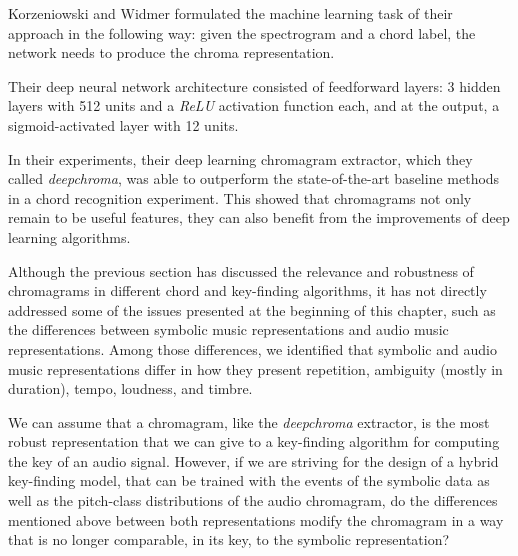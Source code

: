 Korzeniowski and Widmer formulated the machine learning task
of their approach in the following way: given the
spectrogram and a chord label, the network needs to produce
the chroma representation.

Their deep neural network architecture consisted of
feedforward layers: 3 hidden layers with 512 units and a
\emph{ReLU} activation function each, and at the output, a
sigmoid-activated layer with 12 units.

In their experiments, their deep learning chromagram
extractor, which they called \emph{deepchroma}, was able to
outperform the state-of-the-art baseline methods in a chord
recognition experiment. This showed that chromagrams not
only remain to be useful features, they can also benefit
from the improvements of deep learning algorithms.


Although the previous section has discussed the relevance
and robustness of chromagrams in different chord and
key-finding algorithms, it has not directly addressed some
of the issues presented at the beginning of this chapter,
such as the differences between symbolic music
representations and audio music representations. Among those
differences, we identified that symbolic and audio music
representations differ in how they present repetition,
ambiguity (mostly in duration), tempo, loudness, and timbre.

We can assume that a chromagram, like the \emph{deepchroma}
extractor, is the most robust representation that we can
give to a key-finding algorithm for computing the key of an
audio signal. However, if we are striving for the design of
a hybrid key-finding model, that can be trained with the
events of the symbolic data as well as the pitch-class
distributions of the audio chromagram, do the differences
mentioned above between both representations modify the
chromagram in a way that is no longer comparable, in its
key, to the symbolic representation?


